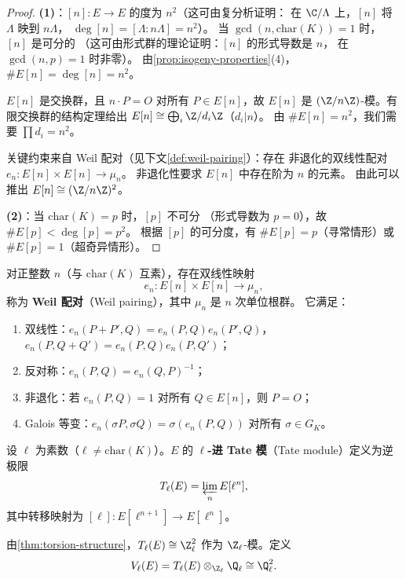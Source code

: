 \begin{proof}
\textbf{(1)}：$[n]\colon E \to E$ 的度为 $n^2$（这可由复分析证明：
在 $\C/\Lambda$ 上，$[n]$ 将 $\Lambda$ 映到 $n\Lambda$，
$\deg[n] = [\Lambda : n\Lambda] = n^2$）。
当 $\gcd(n, \mathrm{char}(K)) = 1$ 时，$[n]$ 是可分的
（这可由形式群的理论证明：$[n]$ 的形式导数是 $n$，
在 $\gcd(n, p) = 1$ 时非零）。
由\cref{prop:isogeny-properties}(4)，$\#E[n] = \deg[n] = n^2$。

$E[n]$ 是交换群，且 $n \cdot P = O$ 对所有 $P \in E[n]$，故
$E[n]$ 是 $(\Z/n\Z)$-模。有限交换群的结构定理给出
$E[n] \cong \bigoplus_{i} \Z/d_i\Z$（$d_i | n$）。
由 $\#E[n] = n^2$，我们需要 $\prod d_i = n^2$。

关键约束来自 Weil 配对（见下文\cref{def:weil-pairing}）：存在
非退化的双线性配对 $e_n\colon E[n] \times E[n] \to \mu_n$。
非退化性要求 $E[n]$ 中存在阶为 $n$ 的元素。
由此可以推出 $E[n] \cong (\Z/n\Z)^2$。

\textbf{(2)}：当 $\mathrm{char}(K) = p$ 时，$[p]$ 不可分
（形式导数为 $p = 0$），故 $\#E[p] < \deg[p] = p^2$。
根据 $[p]$ 的可分度，有 $\#E[p] = p$（寻常情形）或
$\#E[p] = 1$（超奇异情形）。
\end{proof}

\begin{definition}[Weil 配对]
\label{def:weil-pairing}
对正整数 $n$（与 $\mathrm{char}(K)$ 互素），存在双线性映射
\[
  e_n\colon E[n] \times E[n] \to \mu_n,
\]
称为 \textbf{Weil 配对}（Weil pairing），其中 $\mu_n$ 是 $n$ 次单位根群。
它满足：
\begin{enumerate}
  \item 双线性：$e_n(P + P', Q) = e_n(P, Q) e_n(P', Q)$，
    $e_n(P, Q + Q') = e_n(P, Q) e_n(P, Q')$；
  \item 反对称：$e_n(P, Q) = e_n(Q, P)^{-1}$；
  \item 非退化：若 $e_n(P, Q) = 1$ 对所有 $Q \in E[n]$，则 $P = O$；
  \item Galois 等变：$e_n(\sigma P, \sigma Q) = \sigma(e_n(P, Q))$
    对所有 $\sigma \in G_K$。
\end{enumerate}
\end{definition}

\begin{definition}[Tate 模]
\label{def:tate-module}
设 $\ell$ 为素数（$\ell \neq \mathrm{char}(K)$）。$E$ 的
\textbf{$\ell$-进 Tate 模}（Tate module）定义为逆极限
\[
  T_\ell(E) = \varprojlim_{n} E[\ell^n],
\]
其中转移映射为 $[\ell]\colon E[\ell^{n+1}] \to E[\ell^n]$。

由\cref{thm:torsion-structure}，$T_\ell(E) \cong \Z_\ell^2$
作为 $\Z_\ell$-模。定义
\[
  V_\ell(E) = T_\ell(E) \otimes_{\Z_\ell} \Q_\ell \cong \Q_\ell^2.
\]
\end{definition}

